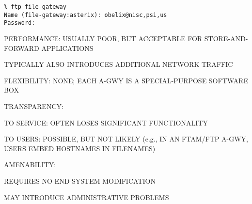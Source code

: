 \begin{bwslide}

\vskip1.5in
\begin{verbatim}
% ftp file-gateway
Name (file-gateway:asterix): obelix@nisc,psi,us
Password:
\end{verbatim}
\end{bwslide}






\begin{bwslide}

\begin{nrtc}
\item	PERFORMANCE: USUALLY POOR, BUT ACCEPTABLE FOR STORE-AND-FORWARD
	APPLICATIONS
    \begin{nrtc}
    \item	TYPICALLY ALSO INTRODUCES ADDITIONAL NETWORK TRAFFIC
    \end{nrtc}

\item	FLEXIBILITY: NONE; EACH A-GWY IS A SPECIAL-PURPOSE SOFTWARE BOX

\item	TRANSPARENCY: 
    \begin{nrtc}
    \item	TO SERVICE: OFTEN LOSES SIGNIFICANT FUNCTIONALITY

    \item	TO USERS: POSSIBLE, BUT NOT LIKELY (e.g., IN AN FTAM/FTP A-GWY,
		USERS EMBED HOSTNAMES IN FILENAMES)
    \end{nrtc}

\item	AMENABILITY:
    \begin{nrtc}
    \item	REQUIRES NO END-SYSTEM MODIFICATION

    \item	MAY INTRODUCE ADMINISTRATIVE PROBLEMS
    \end{nrtc}
\end{nrtc}
\end{bwslide}


